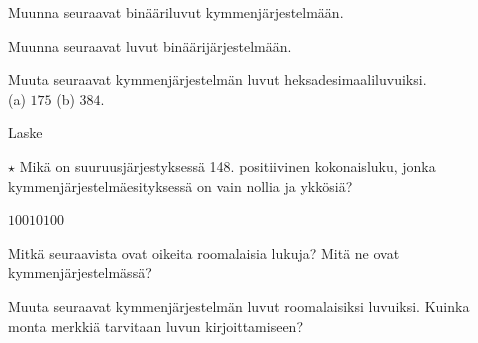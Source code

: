 \begin{tehtavasivu}

\begin{tehtava}
Muunna seuraavat binääriluvut kymmenjärjestelmään.
\begin{vastaus}
\end{vastaus}
\end{tehtava}

\begin{tehtava}
Muunna seuraavat luvut binäärijärjestelmään.
\begin{vastaus}
\end{vastaus}
\end{tehtava}
\begin{tehtava}
Muuta seuraavat kymmenjärjestelmän luvut heksadesimaaliluvuiksi. \\
	(a) $175$ 
	(b) $384$.

\end{tehtava}

\begin{tehtava}
	Laske
	\begin{vastaus}
	\end{vastaus}
\end{tehtava}

\begin{tehtava}
	$\star$ Mikä on suuruusjärjestyksessä 148. positiivinen kokonaisluku, jonka kymmenjärjestelmäesityksessä on vain nollia ja ykkösiä?
	\begin{vastaus}
		$10010100$
	\end{vastaus}
\end{tehtava}

\begin{tehtava}
Mitkä seuraavista ovat oikeita roomalaisia lukuja? Mitä ne ovat kymmenjärjestelmässä?
\begin{vastaus}
\end{vastaus}
\end{tehtava}

\begin{tehtava}
Muuta seuraavat kymmenjärjestelmän luvut roomalaisiksi luvuiksi. Kuinka monta merkkiä tarvitaan luvun kirjoittamiseen?
\begin{vastaus}
\end{vastaus}
\end{tehtava}

\end{tehtavasivu}
